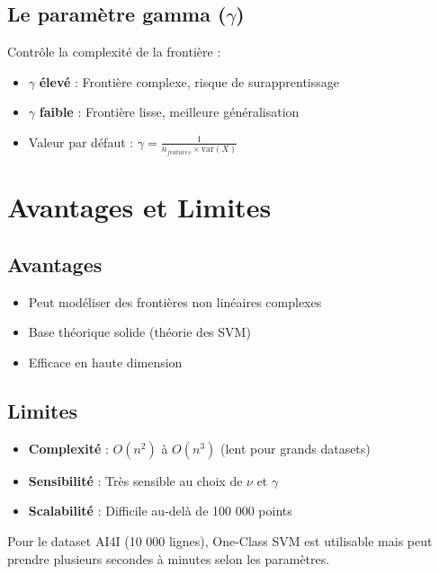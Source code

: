 \documentclass[a4paper,11pt]{article}
\begin{document}
\subsection{Le paramètre gamma ($\gamma$)}

Contrôle la complexité de la frontière :
\begin{itemize}
    \item $\gamma$ \textbf{élevé} : Frontière complexe, risque de surapprentissage
    \item $\gamma$ \textbf{faible} : Frontière lisse, meilleure généralisation
    \item Valeur par défaut : $\gamma = \frac{1}{n_{features} \times \text{var}(X)}$
\end{itemize}

\section{Avantages et Limites}

\subsection{Avantages}
\begin{itemize}
    \item Peut modéliser des frontières non linéaires complexes
    \item Base théorique solide (théorie des SVM)
    \item Efficace en haute dimension
\end{itemize}

\subsection{Limites}
\begin{itemize}
    \item \textbf{Complexité} : $O(n^2)$ à $O(n^3)$ (lent pour grands datasets)
    \item \textbf{Sensibilité} : Très sensible au choix de $\nu$ et $\gamma$
    \item \textbf{Scalabilité} : Difficile au-delà de 100 000 points
\end{itemize}

\begin{warningbox}
Pour le dataset AI4I (10 000 lignes), One-Class SVM est utilisable mais peut prendre plusieurs secondes à minutes selon les paramètres.
\end{warningbox}
\end{document}

